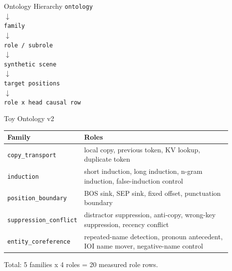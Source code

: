 \documentclass[aspectratio=169]{beamer}
\begin{document}
\begin{frame}{Ontology Hierarchy}
  \centering
  \large
  \texttt{ontology}\\
  \vspace{0.15cm}
  $\downarrow$\\
  \texttt{family}\\
  \vspace{0.15cm}
  $\downarrow$\\
  \texttt{role / subrole}\\
  \vspace{0.15cm}
  $\downarrow$\\
  \texttt{synthetic scene}\\
  \vspace{0.15cm}
  $\downarrow$\\
  \texttt{target positions}\\
  \vspace{0.15cm}
  $\downarrow$\\
  \texttt{role x head causal row}
\end{frame}

\begin{frame}{Toy Ontology v2}
  \small
  \begin{tabular}{p{0.25\linewidth}p{0.66\linewidth}}
    \toprule
    Family & Roles \\
    \midrule
    \texttt{copy\_transport} & local copy, previous token, KV lookup, duplicate token \\
    \texttt{induction} & short induction, long induction, n-gram induction, false-induction control \\
    \texttt{position\_boundary} & BOS sink, SEP sink, fixed offset, punctuation boundary \\
    \texttt{suppression\_conflict} & distractor suppression, anti-copy, wrong-key suppression, recency conflict \\
    \texttt{entity\_coreference} & repeated-name detection, pronoun antecedent, IOI name mover, negative-name control \\
    \bottomrule
  \end{tabular}

  \vspace{0.4cm}
  Total: 5 families x 4 roles = 20 measured role rows.
\end{frame}
\end{document}
